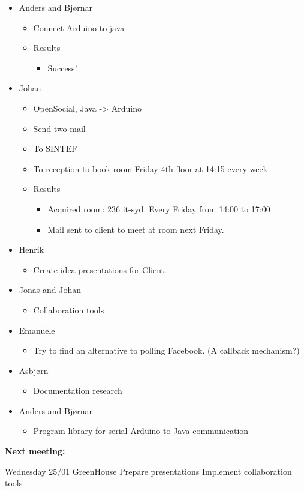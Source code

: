 \begin{itemize}
	\item Anders and Bjørnar
	\begin{itemize}
		\item Connect Arduino to java
		\item Results
		\begin{itemize}
			\item Success!
		\end{itemize}
	\end{itemize}

	\item Johan
	\begin{itemize}
		\item OpenSocial, Java -> Arduino
		\item Send two mail
		\item To SINTEF
		\item To reception to book room Friday 4th floor at 14:15 every week
		\item Results
		\begin{itemize}
			\item Acquired room: 236 it-syd. Every Friday from 14:00 to 17:00
			\item Mail sent to client to meet at room next Friday.
		\end{itemize}
	\end{itemize}
\end{itemize}

\begin{itemize}
	\item Henrik
	\begin{itemize}
		\item Create idea presentations for Client.
	\end{itemize}

	\item Jonas and Johan
	\begin{itemize}
		\item Collaboration tools
	\end{itemize}

	\item Emanuele
	\begin{itemize}
		\item Try to find an alternative to polling Facebook. (A callback mechanism?)
	\end{itemize}

	\item Asbjørn
	\begin{itemize}
		\item Documentation research
	\end{itemize}

	\item Anders and Bjørnar
	\begin{itemize}
		\item Program library for serial Arduino to Java communication
	\end{itemize}
\end{itemize}

\textbf{Next meeting:}

Wednesday 25/01 GreenHouse\newline
Prepare presentations\newline
Implement collaboration tools
